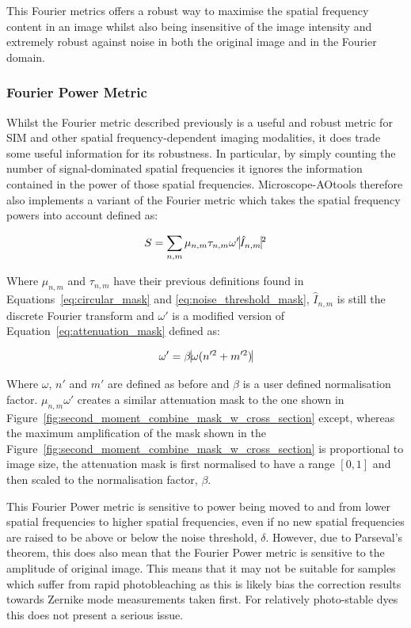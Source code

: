This Fourier metrics offers a robust way to maximise the spatial frequency content in an image whilst also being insensitive of the image intensity and extremely robust against noise in both the original image and in the Fourier domain.

\subsubsection{Fourier Power Metric}

Whilst the Fourier metric described previously is a useful and robust metric for SIM and other spatial frequency-dependent imaging modalities, it does trade some useful information for its robustness. In particular, by simply counting the number of signal-dominated spatial frequencies it ignores the information contained in the power of those spatial frequencies. Microscope-AOtools therefore also implements a variant of the Fourier metric which takes the spatial frequency powers into account defined as:

\begin{equation}\label{eq:Fourier_power_metric}
S = \sum\limits_{n,m}{\mu_{n,m}\tau_{n,m}\omega'\vline \hat{I}_{n,m} \vline^2}
\end{equation}

Where $\mu_{n,m}$ and $\tau_{n,m}$ have their previous definitions found in Equations~\ref{eq:circular_mask} and \ref{eq:noise_threshold_mask}, $\hat{I}_{n,m}$ is still the discrete Fourier transform and $\omega'$ is a modified version of Equation~\ref{eq:attenuation_mask} defined as:

\begin{equation}\label{eq:attenuation_mask_norm_and_scaled}
\omega' = \beta \vline \omega(n'^{2} + m'^{2}) \vline
\end{equation}

Where $\omega$, $n'$ and $m'$ are defined as before and $\beta$ is a user defined normalisation factor. $\mu_{n,m}\omega'$ creates a similar attenuation mask to the one shown in Figure~\ref{fig:second_moment_combine_mask_w_cross_section} except, whereas the maximum amplification of the mask shown in the Figure~\ref{fig:second_moment_combine_mask_w_cross_section} is proportional to image size, the attenuation mask is first normalised to have a range $[0,1]$ and then scaled to the normalisation factor, $\beta$.

This Fourier Power metric is sensitive to power being moved to and from lower spatial frequencies to higher spatial frequencies, even if no new spatial frequencies are raised to be above or below the noise threshold, $\delta$. However, due to Parseval's theorem, this does also mean that the Fourier Power metric is sensitive to the amplitude of original image. This means that it may not be suitable for samples which suffer from rapid photobleaching as this is likely bias the correction results towards Zernike mode measurements taken first. For relatively photo-stable dyes this does not present a serious issue.

